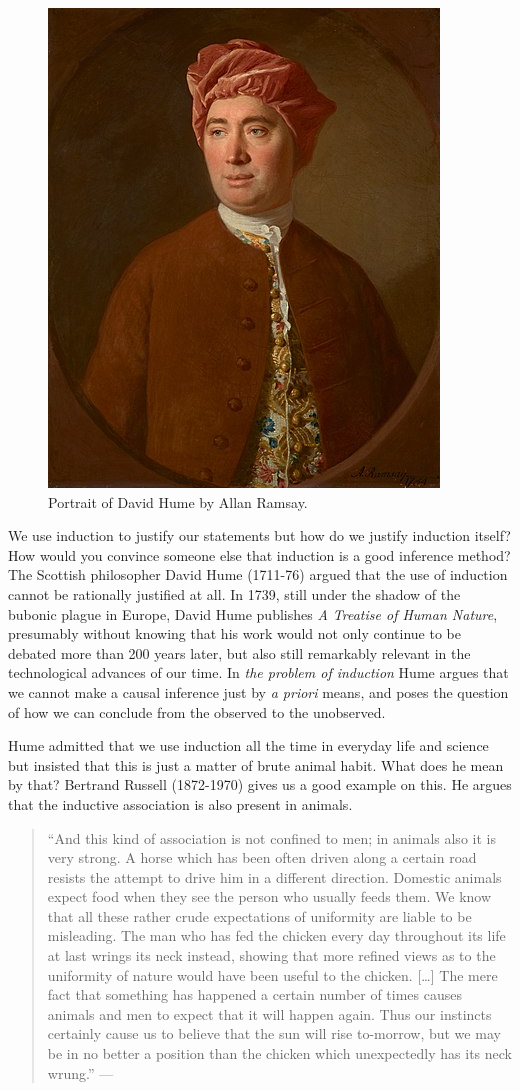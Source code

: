 \documentclass[
]{book}
\begin{document}
\begin{figure}  
 \begin{center}
    \includegraphics[width=.30\textwidth]{Figures/David_Hume.jpg}  
  \captionsetup{labelformat=empty}
  \caption{Portrait of David Hume by Allan Ramsay.} 
\end{center}
\end{figure}
\addtocounter{figure}{-1}

We use induction to justify our statements but how do we justify induction itself? How would you convince someone else that induction is a good inference method? The Scottish philosopher David Hume (1711-76) argued that the use of induction cannot be rationally justified at all. In 1739, still under the shadow of the bubonic plague in Europe, David Hume publishes \emph{A Treatise of Human Nature}, presumably without knowing that his work would not only continue to be debated more than 200 years later, but also still remarkably relevant in the technological advances of our time. In \emph{the problem of induction} Hume argues that we cannot make a causal inference just by \emph{a priori} means, and poses the question of how we can conclude from the observed to the unobserved.

Hume admitted that we use induction all the time in everyday life and science but insisted that this is just a matter of brute animal habit. What does he mean by that? Bertrand Russell (1872-1970) gives us a good example on this. He argues that the inductive association is also present in animals.

\begin{quote}
``And this kind of association is not confined to men; in animals also it is very strong. A horse which has been often driven along a certain road resists the attempt to drive him in a different direction. Domestic animals expect food when they see the person who usually feeds them. We know that all these rather crude expectations of uniformity are liable to be misleading. The man who has fed the chicken every day throughout its life at last wrings its neck instead, showing that more refined views as to the uniformity of nature would have been useful to the chicken. {[}\ldots{]} The mere fact that something has happened a certain number of times causes animals and men to expect that it will happen again. Thus our instincts certainly cause us to believe that the sun will rise to-morrow, but we may be in no better a position than the chicken which unexpectedly has its neck wrung.'' --- \citep{russell2001problems}
\end{quote}
\end{document}

